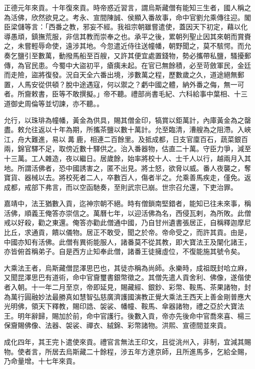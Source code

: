 \begin{pinyinscope}
正德元年來貢。十年復來貢。時帝惑近習言，謂烏斯藏僧有能知三生者，國人稱之為活佛，欣然欲見之。考永、宣間陳誠、侯顯入番故事，命中官劉允乘傳往迎。閣臣梁儲等言：「西番之教，邪妄不經。我祖宗朝雖嘗遣使，蓋因天下初定，藉以化導愚頑，鎮撫荒服，非信其教而崇奉之也。承平之後，累朝列聖止因其來朝而賞賚之，未嘗輕辱命使，遠涉其地。今忽遣近侍往送幢幡，朝野聞之，莫不駭愕。而允奏乞鹽引至數萬，動撥馬船至百艘，又許其便宜處置錢物，勢必攜帶私鹽，騷擾郵傳，為官民患。今蜀中大盜初平，瘡痍未起。在官已無餘積，必至苛斂軍民，金廷而走險，盜將復發。況自天全六番出境，涉數萬之程，歷數歲之久，道途絕無郵置，人馬安從供頓？脫中途遇寇，何以禦之？虧中國之體，納外番之侮，無一可者。所齎敕書，臣等不敢撰擬。」帝不聽。禮部尚書毛紀、六科給事中葉相、十三道御史周倫等並切諫，亦不聽。。

允行，以珠琲為幢幡，黃金為供具，賜其僧金印，犒賞以鉅萬計，內庫黃金為之罄盡。敕允往返以十年為期，所攜茶鹽以數十萬計。允至臨清，漕艘為之阻滯。入峽江，舟大難進，易以冓鹿，相連二百餘里。及抵成都，日支官廩百石，蔬菜銀百兩，錦官驛不足，取傍近數十驛供之。治入番器物，估直二十萬。守臣力爭，減至十三萬。工人雜造，夜以繼日。居歲餘，始率將校十人、士千人以行，越兩月入其地。所謂活佛者，恐中國誘害之，匿不出見。將士怒，欲脅以威。番人夜襲之，奪寶貨、器械以去。將校死者二人，卒數百人，傷者半之。允乘善馬疾走，僅免。返成都，戒部下弗言，而以空函馳奏，至則武宗已崩。世宗召允還，下吏治罪。

嘉靖中，法王猶數入貢，迄神宗朝不絕。時有僧鎖南堅錯者，能知已往未來事，稱活佛，順義王俺答亦崇信之。萬曆七年，以迎活佛為名，西侵瓦剌，為所敗。此僧戒以好殺，勸之東還。俺答亦勸此僧通中國，乃自甘州遺書張居正，自稱釋迦摩尼比丘，求通貢，饋以儀物。居正不敢受，聞之於帝。帝命受之，而許其貢。由是，中國亦知有活佛。此僧有異術能服人，諸番莫不從其教，即大寶法王及闡化諸王，亦皆俯首稱弟子。自是西方止知奉此僧，諸番王徒擁虛位，不復能施其號令矣。

大乘法王者，烏斯藏僧昆澤思巴也，其徒亦稱為尚師。永樂時，成祖既封哈立麻，又聞昆澤思巴有道術，命中官齎璽書銀幣徵之。其僧先遣人貢舍利、佛像，遂偕使者入朝。十一年二月至京，帝即延見，賜藏經、銀鈔、彩幣、鞍馬、茶果諸物，封為萬行圓融妙法最勝真如慧智弘慈廣濟護國演教正覺大乘法王西天上善金剛普應大光明佛，領天下釋教，賜印誥、袈裟、幡幢、鞍馬、傘器諸物，禮之亞於大寶法王。明年辭歸，賜加於前，命中官護行。後數入貢，帝亦先後命中官喬來喜、楊三保齎賜佛像、法器、袈裟、禪衣、絨錦、彩幣諸物。洪熙、宣德間並來貢。

成化四年，其王完卜遣使來貢。禮官言無法王印文，且從洮州入，非制，宜減其賜物。使者言，所居去烏斯藏二十餘程，涉五年方達京師，且所進馬多，乞給全賜，乃命量增。十七年來貢。


\end{pinyinscope}
